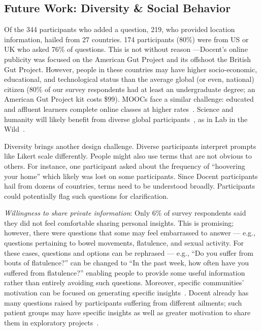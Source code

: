 \subsection{Future Work: Diversity \& Social Behavior}
Of the 344 participants who added a question, 219, who provided location information, hailed from 27 countries. 174 participants (80\%) were from US or UK who asked 76\% of questions. This is not without reason —Docent’s online publicity was focused on the American Gut Project and its offshoot the British Gut Project. However, people in these countries may have higher socio-economic, educational, and technological status than the average global (or even, national) citizen (80\% of our survey respondents had at least an undergraduate degree; an American Gut Project kit costs \$99). MOOCs face a similar challenge: educated and affluent learners complete online classes at higher rates~\cite{Kizilcec2017b}. Science and humanity will likely benefit from diverse global participants~\cite{Henrich2010a}, as in Lab in the Wild~\cite{Reinecke2015}.

Diversity brings another design challenge. Diverse participants interpret prompts like Likert scale differently. People might also use terms that are not obvious to others. For instance, one participant asked about the frequency of “hoovering your home” which likely was lost on some participants. Since Docent participants hail from dozens of countries, terms need to be understood broadly. Participants could potentially flag such questions for clarification. 

\textit{Willingness to share private information}: Only 6\% of survey respondents said they did not feel comfortable sharing personal insights. This is promising; however, there were questions that some may feel embarrassed to answer — e.g., questions pertaining to bowel movements, flatulence, and sexual activity. For these cases, questions and options can be rephrased — e.g., “Do you suffer from bouts of flatulence?” can be changed to “In the past week, how often have you suffered from flatulence?” enabling people to provide some useful information rather than entirely avoiding such questions. Moreover, specific communities’ motivation can be focused on generating specific insights~\cite{Chandler2013}. Docent already has many questions raised by participants suffering from different ailments; such patient groups may have specific insights as well as greater motivation to share them in exploratory projects~\cite{Karkar2017a}.

